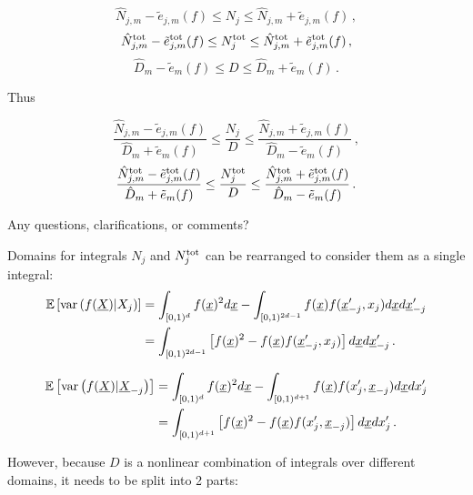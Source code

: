 \documentclass[]{amsart}
\newcommand{\oerr}{e}
\begin{document}
$$\hat{N}_{j,m}-\tilde{\oerr}_{j,m}(f) \leq N_j \leq \hat{N}_{j,m}+\tilde{\oerr}_{j,m}(f)  \, ,$$
$$\hat{N}_{j,m}^{\textup{tot}}-\tilde{\oerr}_{j,m}^{\textup{tot}}(f) \leq N_j^{\textup{tot}} \leq \hat{N}_{j,m}^{\textup{tot}}+\tilde{\oerr}_{j,m}^{\textup{tot}}(f) \, ,$$
$$\hat{D}_{m}-\tilde{\oerr}_{m}(f) \leq D \leq \hat{D}_{m}+\tilde{\oerr}_{m}(f)  \, .$$


Thus

\begin{equation}\label{err_bound_j}
\frac{\hat{N}_{j,m}-\tilde{\oerr}_{j,m}(f)}{\hat{D}_{m}+\tilde{\oerr}_{m}(f) } \leq \frac{N_j}{D} \leq \frac{\hat{N}_{j,m}+\tilde{\oerr}_{j,m}(f)}{\hat{D}_{m}-\tilde{\oerr}_{m}(f) }\, ,
\end{equation}
\begin{equation}\label{err_bound_jtot}
\frac{\hat{N}_{j,m}^{\textup{tot}}-\tilde{\oerr}_{j,m}^{\textup{tot}}(f) }{\hat{D}_{m}+\tilde{\oerr}_{m}(f)} \leq \frac{N_{j}^{\textup{tot}}}{D} \leq \frac{ \hat{N}_{j,m}^{\textup{tot}}+\tilde{\oerr}_{j,m}^{\textup{tot}}(f)}{\hat{D}_{m}-\tilde{\oerr}_{m}(f)} \, .
\end{equation}

\bigskip

Any questions, clarifications, or comments?

Domains for integrals $N_j$ and $N_j^{\textup{tot}}$ can be rearranged to consider them as a single integral:
\begin{align*}
\mathbb{E}\left[ \operatorname{var} \left(f(\underline{X})|X_j\right)\right] & = \int_{[0,1)^d}f(\underline{x})^2 d \underline{x} - \int_{[0,1)^{2d-1}}f(\underline{x})f(\underline{x}'_{-j},x_j)d \underline{x} d \underline{x}'_{-j} \\
& = \int_{[0,1)^{2d-1}}\left[f(\underline{x})^2-f(\underline{x})f(\underline{x}'_{-j},x_j)\right] d \underline{x} d \underline{x}'_{-j} \, . 
\end{align*}

\begin{align*}
\mathbb{E}\left[ \operatorname{var} \left(f(\underline{X})|\underline{X}_{-j}\right)\right] & = \int_{[0,1)^d}f(\underline{x})^2 d \underline{x} - \int_{[0,1)^{d+1}}f(\underline{x})f(x'_{j},\underline{x}_{-j})d \underline{x} d {x}'_{j} \\
& = \int_{[0,1)^{d+1}}\left[f(\underline{x})^2-f(\underline{x})f(x'_{j},\underline{x}_{-j})\right] d \underline{x} d {x}'_{j} \, . 
\end{align*}

However, because $D$ is a nonlinear combination of integrals over different domains, it needs to be split into 2 parts:
\end{document}
